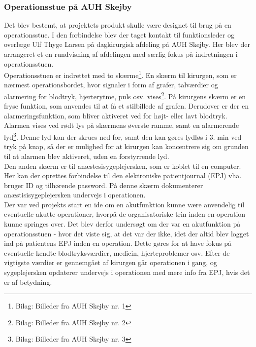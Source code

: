 \subsubsection{Operationsstue på AUH Skejby}
Det blev bestemt, at projektets produkt skulle være designet til brug på en operationsstue. I den forbindelse blev der taget kontakt til funktionsleder og overlæge Ulf Thyge Larsen på dagkirurgisk afdeling på AUH Skejby. Her blev der arrangeret et en rundvisning af afdelingen med særlig fokus på indretningen i operationsstuen.\\
\newline
Operationsstuen er indrettet med to skærme\footnote{Bilag: Billeder fra AUH Skejby nr. 1}. En skærm til kirurgen, som er nærmest operationsbordet, hvor signaler i form af grafer, talværdier og alarmering for blodtryk, hjerterytme, puls osv. vises\footnote{Bilag: Billeder fra AUH Skejby nr. 2}. På kirurgens skærm er en fryse funktion, som anvendes til at få et stilbillede af grafen. Derudover er der en alarmeringsfunktion, som bliver aktiveret ved for højt- eller lavt blodtryk. Alarmen vises ved rødt lys på skærmens øverste ramme, samt en alarmerende lyd\footnote{Bilag: Billeder fra AUH Skejby nr. 3}. Denne lyd kan der skrues ned for, samt den kan gøres lydløs i 3. min ved tryk på knap, så der er mulighed for at kirurgen kan koncentrere sig om grunden til at alarmen blev aktiveret, uden en forstyrrende lyd.\\
\newline
Den anden skærm er til anæstesisygeplejersken, som er koblet til en computer. Her kan der oprettes forbindelse til den elektroniske patientjournal (EPJ) vha. bruger ID og tilhørende password. På denne skærm dokumenterer anæstisisygeplejersken undervejs i operationen.\\
\newline
Der var ved projekts start en ide om en akutfunktion kunne være anvendelig til eventuelle akutte operationer, hvorpå de organisatoriske trin inden en operation kunne springes over. Det blev derfor undersøgt om der var en akutfunktion på operationsstuen - hvor det viste sig, at det var der ikke, idet der altid blev logget ind på patientens EPJ inden en operation. Dette gøres for at have fokus på eventuelle kendte blodtryksværdier, medicin, hjerteproblemer osv. Efter de vigtigste værdier er gennemgået af kirurgen går operationen i gang, og sygeplejersken opdaterer undervejs i operationen med mere info fra EPJ, hvis det er af betydning. \\
\newline
